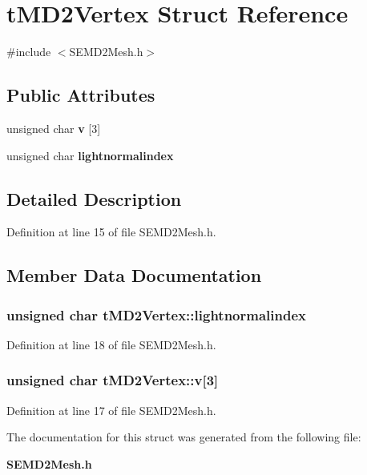\section{t\+M\+D2\+Vertex Struct Reference}
\label{structt_m_d2_vertex}


{\ttfamily \#include $<$S\+E\+M\+D2\+Mesh.\+h$>$}

\subsection*{Public Attributes}
\begin{DoxyCompactItemize}
\item 
unsigned char {\bf v} [3]
\item 
unsigned char {\bf lightnormalindex}
\end{DoxyCompactItemize}


\subsection{Detailed Description}


Definition at line 15 of file S\+E\+M\+D2\+Mesh.\+h.



\subsection{Member Data Documentation}
\subsubsection[{lightnormalindex}]{\setlength{\rightskip}{0pt plus 5cm}unsigned char t\+M\+D2\+Vertex\+::lightnormalindex}\label{structt_m_d2_vertex_ad93902a23d569e60cf8053bb46c276c0}


Definition at line 18 of file S\+E\+M\+D2\+Mesh.\+h.

\subsubsection[{v}]{\setlength{\rightskip}{0pt plus 5cm}unsigned char t\+M\+D2\+Vertex\+::v[3]}\label{structt_m_d2_vertex_a2c3ac9e35f3b92e0d5116f2702de2db5}


Definition at line 17 of file S\+E\+M\+D2\+Mesh.\+h.



The documentation for this struct was generated from the following file\+:\begin{DoxyCompactItemize}
\item 
{\bf S\+E\+M\+D2\+Mesh.\+h}\end{DoxyCompactItemize}
